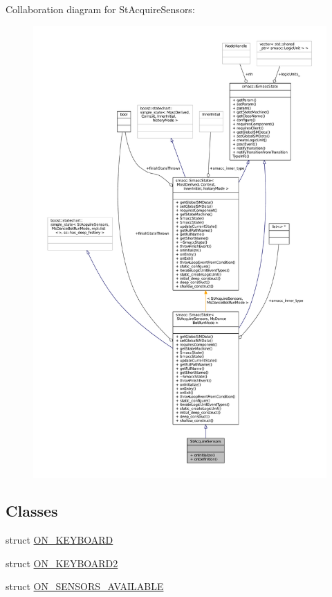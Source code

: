 Collaboration diagram for St\+Acquire\+Sensors\+:
\nopagebreak
\begin{figure}[H]
\begin{center}
\leavevmode
\includegraphics[width=350pt]{structStAcquireSensors__coll__graph}
\end{center}
\end{figure}
\subsection*{Classes}
\begin{DoxyCompactItemize}
\item 
struct \hyperlink{structStAcquireSensors_1_1ON__KEYBOARD}{O\+N\+\_\+\+K\+E\+Y\+B\+O\+A\+RD}
\item 
struct \hyperlink{structStAcquireSensors_1_1ON__KEYBOARD2}{O\+N\+\_\+\+K\+E\+Y\+B\+O\+A\+R\+D2}
\item 
struct \hyperlink{structStAcquireSensors_1_1ON__SENSORS__AVAILABLE}{O\+N\+\_\+\+S\+E\+N\+S\+O\+R\+S\+\_\+\+A\+V\+A\+I\+L\+A\+B\+LE}
\end{DoxyCompactItemize}
